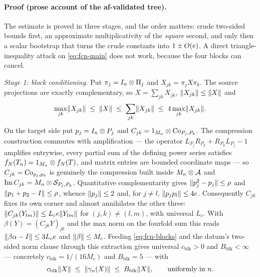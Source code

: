 \paragraph{Proof (prose account of the af-validated tree).}
The estimate is proved in three stages, and the order matters: crude two-sided bounds
first, an approximate multiplicativity of the \emph{square} second, and only then a scalar
bootstrap that turns the crude constants into $1\pm O(e)$. A direct triangle-inequality
attack on \eqref{eq:fcn-main} does not work, because the four blocks can cancel.

\emph{Stage 1: block conditioning.} Put $\pi_j=I_{n}\otimes \Pi_j$ and $X_{jk}=\pi_jX\pi_k$.
The source projections are exactly complementary, so $X=\sum_{jk}X_{jk}$,
$\lVert X_{jk}\rVert\le\lVert X\rVert$ and
\begin{equation}\label{eq:fcn-blocks}
  \max_{jk}\lVert X_{jk}\rVert\;\le\;\lVert X\rVert\;\le\;\sum_{jk}\lVert X_{jk}\rVert\;\le\;4\max_{jk}\lVert X_{jk}\rVert .
\end{equation}
On the target side put $p_j=I_{n}\otimes P_j$ and $C_{jk}=1_{M_{n}}\otimes\mathrm{Co}_{P_j,P_k}$. The
compression construction commutes with amplification --- the operator
$L_{P_j}R_{P_k}+R_{P_k}L_{P_j}-1$ amplifies entrywise, every partial sum of the defining
power series satisfies $f_N(T_n)=1_{M_{n}}\otimes f_N(T)$, and matrix entries are bounded
coordinate maps --- so $C_{jk}=\mathrm{Co}_{p_j,p_k}$ is genuinely the compression built inside
$M_{n}\otimes \mathcal A$ and $\operatorname{Im} C_{jk}=M_{n}\otimes \mathcal S_{P_j,P_k}$. Quantitative
complementarity gives $\lVert p_j^{2}-p_j\rVert\le\rho$ and $\lVert p_1+p_2-I\rVert\le\rho$, whence
$\lVert p_j\rVert\le2$ and, for $j\ne l$, $\lVert p_jp_l\rVert\le4e$. Consequently $C_{jk}$ fixes its
own corner and almost annihilates the other three:
$\lVert C_{jk}(Y_{lm})\rVert\le L_ce\lVert Y_{lm}\rVert$ for $(j,k)\ne(l,m)$, with universal $L_c$.
With $\beta(Y)=(C_{jk}Y)_{jk}$ and the max norm on the fourfold sum this reads
$\lVert \beta\alpha-I\rVert\le3L_ce$ and $\lVert \beta\rVert\le M_c$. Feeding
\eqref{eq:fcn-blocks} and the datum's two-sided norm clause through this extraction gives
universal $c_{\mathrm{blk}}>0$ and $B_{\mathrm{blk}}<\infty$ --- concretely
$c_{\mathrm{blk}}=1/(16M_c)$ and $B_{\mathrm{blk}}=5$ --- with
\begin{equation}\label{eq:fcn-crude}
  c_{\mathrm{blk}}\lVert X\rVert\;\le\;\lVert \gamma_n(X)\rVert\;\le\;B_{\mathrm{blk}}\lVert X\rVert,
  \qquad\text{uniformly in }n .
\end{equation}

